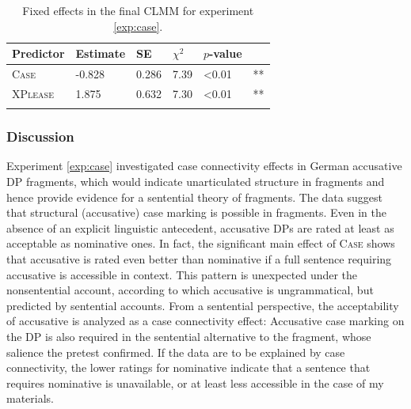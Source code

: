 \begin{table}[t]
\begin{tabular}{l l l l l l}
\lsptoprule
Predictor & Estimate & SE & $\chi^2$ &  $p$-value &  \\   
\midrule
\textsc{Case} & -0.828 &  0.286 &7.39 & \textless 0.01 & ** \\
\textsc{XPlease} &    \phantom{-}1.875 &     0.632 &   7.30 &  \textless 0.01 & **\\
\lspbottomrule
\end{tabular}
\caption{Fixed effects in the final CLMM for experiment \ref{exp:case}. \label{tab:case-estimates}}
\end{table}

\subsubsection{Discussion}
Experiment \ref{exp:case} investigated case connectivity effects in German accusative DP fragments, which would indicate unarticulated structure in fragments and hence provide evidence for a sentential theory of fragments. The data suggest that structural (accusative) case marking is possible in fragments. Even in the absence of an explicit linguistic antecedent, accusative DPs are rated at least as acceptable as nominative ones. In fact, the significant main effect of \textsc{Case} shows that accusative is rated even better than nominative if a full sentence requiring accusative is accessible in context. This pattern is unexpected under the nonsentential account, according to which accusative is ungrammatical, but predicted by sentential accounts. From a sentential perspective, the acceptability of accusative is analyzed as a case connectivity effect: Accusative case marking on the DP is also required in the sentential alternative to the fragment, whose salience the pretest confirmed. If the data are to be explained by case connectivity, the lower ratings for nominative indicate that a sentence that requires nominative is unavailable, or at least less accessible in the case of my materials. 

